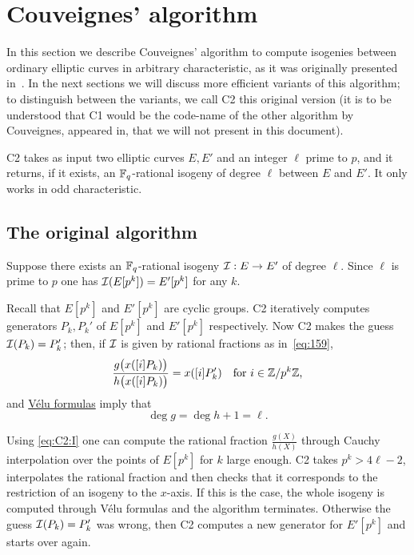 
\section{Couveignes' algorithm}
\label{sec:C2}

In this section we describe Couveignes' algorithm to compute isogenies
between ordinary elliptic curves in arbitrary characteristic, as it
was originally presented in~\cite{couveignes96}. In the next sections
we will discuss more efficient variants of this algorithm; to
distinguish between the variants, we call C2 this original version (it
is to be understood that C1 would be the code-name of the other
algorithm by Couveignes, appeared in\cite{couveignes94}, that we will
not present in this document).

C2 takes as input two elliptic curves $E, E'$ and an integer $\ell$
prime to $p$, and it returns, if it exists, an $\mathbb{F}_q$-rational isogeny
of degree $\ell$ between $E$ and $E'$. It only works in odd
characteristic.

\subsection{The original algorithm}
Suppose there exists an $\mathbb{F}_q$-rational isogeny
$\mathcal{I}:E\rightarrow E'$ of degree $\ell$. Since $\ell$ is prime to $p$
one has $\mathcal{I}(E[p^k]) = E'[p^k]$ for any $k$.

Recall that $E[p^k]$ and $E'[p^k]$ are cyclic groups. C2 iteratively
computes generators $P_k,P_k'$ of $E[p^k]$ and $E'[p^k]$
respectively. Now C2 makes the guess $\mathcal{I}(P_k) = P_k'$; then, if $\mathcal{I}$
is given by rational fractions as in~\eqref{eq:159},
\begin{equation}
  \label{eq:C2:I}
  \frac{g\bigl(x([i]P_k)\bigr)}{h\bigl(x([i]P_k)\bigr)} = x([i]P_k')
  \quad\text{for $i\in\mathbb{Z}/p^k\mathbb{Z}$,} 
\end{equation}
and \hyperref[sec:velu-formulas]{Vélu formulas} imply that
\begin{equation}
  \label{eq:velu-deg}
  \deg g = \deg h + 1 = \ell
  \text{.}
\end{equation}


Using \eqref{eq:C2:I} one can compute the rational fraction
$\frac{g(X)}{h(X)}$ through Cauchy interpolation over the points of
$E[p^k]$ for $k$ large enough. C2 takes $p^k > 4\ell - 2$,
interpolates the rational fraction and then checks that it corresponds
to the restriction of an isogeny to the $x$-axis. If this is the case,
the whole isogeny is computed through Vélu formulas and the algorithm
terminates. Otherwise the guess $\mathcal{I}(P_k) = P_k'$ was wrong, then C2
computes a new generator for $E'[p^k]$ and starts over again.

